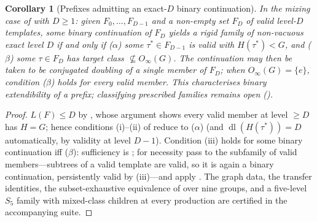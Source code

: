 \documentclass[11pt]{amsart}
\newtheorem{corollary}[corollary]{Corollary}
\theoremstyle{definition}
\theoremstyle{remark}
\theoremstyle{plain}
\theoremstyle{plain}
\numberwithin{equation}{section}
\begin{document}
\begin{corollary}[Prefixes admitting an exact-$D$ binary continuation]
\label{cor:binarylevel}
In the mixing case of  with $D\ge1$: given $F_0,\dots,F_{D-1}$ and a
non-empty set $F_D$ of valid level-$D$ templates, some binary continuation of $F_D$ yields a
rigid family of non-vacuous exact level $D$ if and only if \textup{($\alpha$)} some
$\tau^*\in F_{D-1}$ is valid with $H(\tau^*)<G$, and \textup{($\beta$)} some $\tau\in F_D$ has
target class $\not\subseteq O_\infty(G)$. The continuation may then be taken to be conjugated
doubling of a single member of $F_D$; when $O_\infty(G)=\{e\}$, condition \textup{($\beta$)}
holds for every valid member. This characterises binary \emph{extendibility} of a prefix;
classifying \emph{prescribed} families remains open ().
\end{corollary}
\begin{proof}
$L(F)\le D$ by , whose argument shows every valid member at level $\ge D$
has $H=G$; hence conditions (i)--(ii) of  reduce to ($\alpha$) (and
$\operatorname{dl}(H(\tau^*))=D$ automatically, by validity at level $D-1$). Condition (iii)
holds for some binary continuation iff ($\beta$): sufficiency is ; for
necessity pass to the subfamily of valid members---subtrees of a valid template are valid, so
it is again a binary continuation, persistently valid by (iii)---and apply
. The graph data, the transfer identities, the subset-exhaustive
equivalence of  over nine groups, and a five-level $S_5$ family with
mixed-class children at every production are certified in the accompanying suite.
\end{proof}
\end{document}
